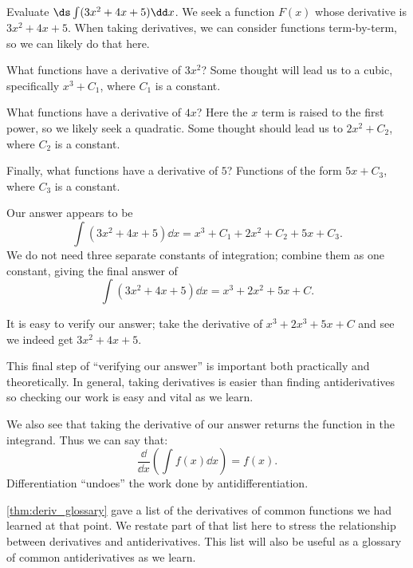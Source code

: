 \begin{example}\label{ex_anti3}
Evaluate $\ds \int (3x^2 + 4x+5)\dd x$.
\solution
We seek a function $F(x)$ whose derivative is $3x^2+4x+5$. When taking derivatives, we can consider functions term-by-term, so we can likely do that here.

What functions have a derivative of $3x^2$? Some thought will lead us to a cubic, specifically $x^3+C_1$, where $C_1$ is a constant. 

What functions have a derivative of $4x$? Here the $x$ term is raised to the first power, so we likely seek a quadratic. Some thought should lead us to $2x^2+C_2$, where $C_2$ is a constant.

Finally, what functions have a derivative of $5$? Functions of the form $5x+C_3$, where $C_3$ is a constant.

Our answer appears to be 
\[\int (3x^2+4x+5)\dd x = x^3+C_1+2x^2+C_2+5x+C_3.\]
We do not need three separate constants of integration; combine them as one constant, giving the final answer of 
\[\int (3x^2+4x+5)\dd x = x^3+2x^2+5x+C.\]

It is easy to verify our answer; take the derivative of $x^3+2x^3+5x+C$ and see we indeed get $3x^2+4x+5$.
\end{example}

This final step of ``verifying our answer'' is important both practically and theoretically. In general, taking derivatives is easier than finding antiderivatives so checking our work is easy and vital as we learn.

We also see that taking the derivative of our answer returns the function in the integrand. Thus we can say that:
\[\frac{\dd}{\dd x}\left(\int f(x)\dd x\right) = f(x).\]
Differentiation ``undoes'' the work done by antidifferentiation. 

\autoref{thm:deriv_glossary} gave a list of the derivatives of common functions we had learned at that point. We restate part of that list here to stress the relationship between derivatives and antiderivatives. This list will also be useful as a glossary of common antiderivatives as we learn.

